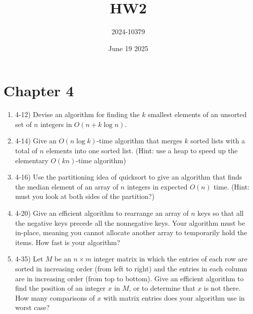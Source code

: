 \documentclass{article}
\title{HW2}
\author{2024-10379}
\date{June 19 2025}
\begin{document}
\maketitle

\section{Chapter 4}
\begin{enumerate}
    \item 4-12) Devise an algorithm for finding the $k$ smallest elements of an unsorted set of $n$ integers in $O(n + k \log n)$.
    
    \item 4-14) Give an $O(n \log k)$-time algorithm that merges $k$ sorted lists with a total of $n$ elements into one sorted list. (Hint: use a heap to speed up the elementary $O(kn)$-time algorithm)
    
    \item 4-16) Use the partitioning idea of quicksort to give an algorithm that finds the median element of an array of $n$ integers in expected $O(n)$ time. (Hint: must you look at both sides of the partition?)
    
    \item 4-20) Give an efficient algorithm to rearrange an array of $n$ keys so that all the negative keys precede all the nonnegative keys. Your algorithm must be in-place, meaning you cannot allocate another array to temporarily hold the items. How fast is your algorithm?
    
    \item 4-35) Let $M$ be an $n \times m$ integer matrix in which the entries of each row are sorted in increasing order (from left to right) and the entries in each column are in increasing order (from top to bottom). Give an efficient algorithm to find the position of an integer $x$ in $M$, or to determine that $x$ is not there. How many comparisons of $x$ with matrix entries does your algorithm use in worst case?

\end{enumerate}
\end{document}
